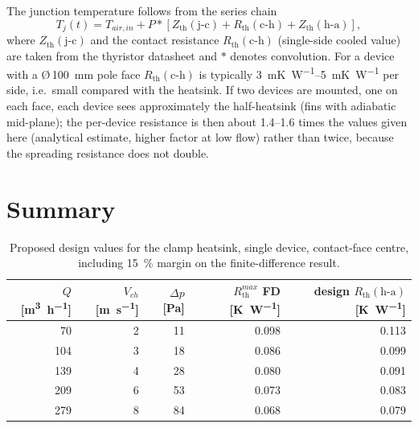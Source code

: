 \documentclass[11pt,a4paper]{article}
\newcommand{\Rth}{R_{\mathrm{th}}}
\newcommand{\Zth}{Z_{\mathrm{th}}}
\begin{document}
The junction temperature follows from the series chain
\begin{equation}
T_j(t) = T_{air,in} + P * \left[\Zth(\mathrm{j\text{-}c}) + \Rth(\mathrm{c\text{-}h}) + \Zth(\mathrm{h\text{-}a})\right],
\end{equation}
where $\Zth(\mathrm{j\text{-}c})$ and the contact resistance $\Rth(\mathrm{c\text{-}h})$ (single-side cooled value) are taken from the thyristor datasheet and $*$ denotes convolution. For a device with a \O\,\SI{100}{\milli\metre} pole face $\Rth(\mathrm{c\text{-}h})$ is typically \SIrange{3}{5}{\milli\kelvin\per\watt} per side, i.e.\ small compared with the heatsink. If two devices are mounted, one on each face, each device sees approximately the half-heatsink (fins with adiabatic mid-plane); the per-device resistance is then about 1.4--1.6 times the values given here (analytical estimate, higher factor at low flow) rather than twice, because the spreading resistance does not double.

\section{Summary}\label{sec:summary}

\begin{table}[htbp]
\centering\small
\caption{Proposed design values for the clamp heatsink, single device, contact-face centre, including \SI{15}{\percent} margin on the finite-difference result.}
\label{tab:summary}
\begin{tabular}{rrrrr}
\toprule
$Q$ [\si{\cubic\metre\per\hour}] & $V_{ch}$ [\si{\metre\per\second}] & $\Delta p$ [\si{\pascal}] & $\Rth^{max}$ FD [\si{\kelvin\per\watt}] & design $\Rth(\mathrm{h\text{-}a})$ [\si{\kelvin\per\watt}] \\
\midrule
 70 & 2 & 11 & 0.098 & 0.113 \\
104 & 3 & 18 & 0.086 & 0.099 \\
139 & 4 & 28 & 0.080 & 0.091 \\
209 & 6 & 53 & 0.073 & 0.083 \\
279 & 8 & 84 & 0.068 & 0.079 \\
\bottomrule
\end{tabular}
\end{table}
\end{document}
